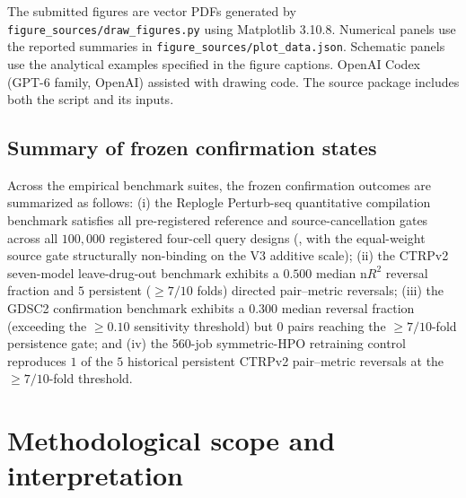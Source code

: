 \documentclass[11pt]{article}
\begin{document}
The submitted figures are vector PDFs generated by \nolinkurl{figure_sources/draw_figures.py} using Matplotlib 3.10.8. Numerical panels use the reported summaries in \nolinkurl{figure_sources/plot_data.json}. Schematic panels use the analytical examples specified in the figure captions. OpenAI Codex (GPT-6 family, OpenAI) assisted with drawing code. The source package includes both the script and its inputs.

\subsection{Summary of frozen confirmation states}
Across the empirical benchmark suites, the frozen confirmation outcomes are summarized as follows: (i) the Replogle Perturb-seq quantitative compilation benchmark satisfies all pre-registered reference and source-cancellation gates across all $100{,}000$ registered four-cell query designs (\texttt{}, with the equal-weight source gate structurally non-binding on the V3 additive scale); (ii) the CTRPv2 seven-model leave-drug-out benchmark exhibits a $0.500$ median $\mathrm{n}R^2$ reversal fraction and $5$ persistent ($\ge 7/10$ folds) directed pair--metric reversals; (iii) the GDSC2 confirmation benchmark exhibits a $0.300$ median reversal fraction (exceeding the $\ge 0.10$ sensitivity threshold) but $0$ pairs reaching the $\ge 7/10$-fold persistence gate; and (iv) the 560-job symmetric-HPO retraining control reproduces $1$ of the $5$ historical persistent CTRPv2 pair--metric reversals at the $\ge 7/10$-fold threshold.



\section{Methodological scope and interpretation}
\end{document}
